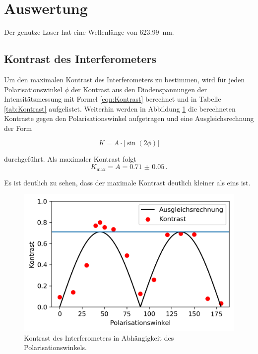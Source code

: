 \section{Auswertung}
Der genutze Laser hat eine Wellenlänge von \SI{623.99}{\nano\meter}.

\subsection{Kontrast des Interferometers}
Um den maximalen Kontrast des Interferometers zu bestimmen, wird für jeden Polarisationswinkel $\phi$  der Kontrast aus den Diodenspannungen der Intensitätsmessung mit Formel \ref{eqn:Kontrast} berechnet und in Tabelle \ref{tab:Kontrast} aufgelistet.
Weiterhin werden in Abbildung \ref{fig:Kontrast} die berechneten Kontraste gegen den Polarisationswinkel aufgetragen und eine Ausgleichsrechnung der Form

\begin{equation*}
  K = A \cdot |\sin(2 \phi)|
\end{equation*}

durchgeführt. Als maximaler Kontrast folgt
\begin{equation}
  K_\text{max} = A = \num{0.71(5)} \, .
  \label{eqn:Kontrast}
\end{equation}

Es ist deutlich zu sehen, dass der maximale Kontrast deutlich kleiner als eins ist.

\begin{figure}[H]
  \centering
  \includegraphics[width = .5\textwidth]{Auswertung/Plots/Kontrast.png}
  \caption{Kontrast des Interferometers in Abhängigkeit des Polarisationswinkels. }
  \label{fig:Kontrast}
\end{figure}

